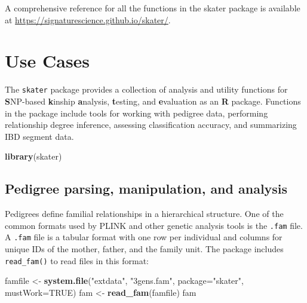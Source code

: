 \documentclass[9pt,a4paper,]{extarticle}
\newenvironment{Shaded}{\begin{snugshade}}{\end{snugshade}}
\newcommand{\DataTypeTok}[1]{\textcolor[rgb]{0.13,0.29,0.53}{#1}}
\newcommand{\KeywordTok}[1]{\textcolor[rgb]{0.13,0.29,0.53}{\textbf{#1}}}
\newcommand{\NormalTok}[1]{#1}
\newcommand{\OtherTok}[1]{\textcolor[rgb]{0.56,0.35,0.01}{#1}}
\newcommand{\StringTok}[1]{\textcolor[rgb]{0.31,0.60,0.02}{#1}}
\begin{document}
A comprehensive reference for all the functions in the skater package is available at \url{https://signaturescience.github.io/skater/}.

\hypertarget{use-cases}{%
\section{Use Cases}\label{use-cases}}

The \texttt{skater} package provides a collection of analysis and utility functions for \textbf{S}NP-based \textbf{k}inship \textbf{a}nalysis, \textbf{t}esting, and \textbf{e}valuation as an \textbf{R} package. Functions in the package include tools for working with pedigree data, performing relationship degree inference, assessing classification accuracy, and summarizing IBD segment data.

\begin{Shaded}
\begin{Highlighting}[]
\KeywordTok{library}\NormalTok{(skater)}
\end{Highlighting}
\end{Shaded}

\hypertarget{pedigree-parsing-manipulation-and-analysis}{%
\subsection{Pedigree parsing, manipulation, and analysis}\label{pedigree-parsing-manipulation-and-analysis}}

Pedigrees define familial relationships in a hierarchical structure. One of the common formats used by PLINK \citep{purcell2007} and other genetic analysis tools is the \texttt{.fam} file. A \texttt{.fam} file is a tabular format with one row per individual and columns for unique IDs of the mother, father, and the family unit. The package includes \texttt{read\_fam()} to read files in this format:

\begin{Shaded}
\begin{Highlighting}[]
\NormalTok{famfile <-}\StringTok{ }\KeywordTok{system.file}\NormalTok{(}\StringTok{"extdata"}\NormalTok{, }\StringTok{"3gens.fam"}\NormalTok{, }\DataTypeTok{package=}\StringTok{"skater"}\NormalTok{, }\DataTypeTok{mustWork=}\OtherTok{TRUE}\NormalTok{)}
\NormalTok{fam <-}\StringTok{ }\KeywordTok{read_fam}\NormalTok{(famfile)}
\NormalTok{fam}
\end{Highlighting}
\end{Shaded}
\end{document}
